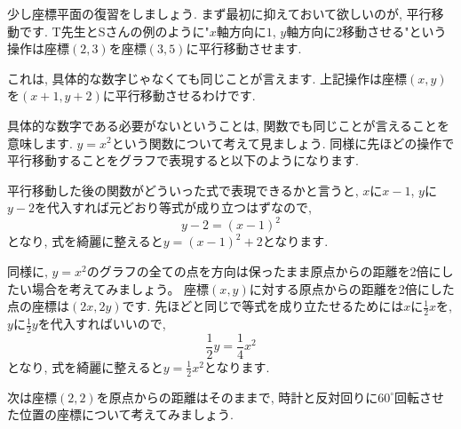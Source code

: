 \documentclass[a4paper,12pt]{jreport}
\theoremstyle{definition}
\newcommand{\ang}[1]{#1^\circ}
\begin{document}
   少し座標平面の復習をしましょう.
   まず最初に抑えておいて欲しいのが, 平行移動です.
   T先生とSさんの例のように"$x$軸方向に$1$, $y$軸方向に$2$移動させる"という操作は座標$(2, 3)$を座標$(3, 5)$に平行移動させます.
   
   これは, 具体的な数字じゃなくても同じことが言えます.
   上記操作は座標$(x, y)$を$(x+1, y+2)$に平行移動させるわけです.
   
   具体的な数字である必要がないということは, 関数でも同じことが言えることを意味します.
   $y=x^2$という関数について考えて見ましょう.
   同様に先ほどの操作で平行移動することをグラフで表現すると以下のようになります.

   \begin{center}
   \end{center}

   平行移動した後の関数がどういった式で表現できるかと言うと,
   $x$に$x-1$, $y$に$y-2$を代入すれば元どおり等式が成り立つはずなので,
   $$y-2=(x-1)^2$$
   となり, 式を綺麗に整えると$y=(x-1)^2+2$となります.

   同様に,
   $y=x^2$のグラフの全ての点を方向は保ったまま原点からの距離を2倍にしたい場合を考えてみましょう。
   座標$(x,y)$に対する原点からの距離を2倍にした点の座標は$(2x,2y)$です.
   先ほどと同じで等式を成り立たせるためには$x$に$\frac{1}{2}x$を,
   $y$に$\frac{1}{2}y$を代入すればいいので,
   $$\frac{1}{2}y=\frac{1}{4}x^2$$
   となり, 式を綺麗に整えると$y=\frac{1}{2}x^2$となります.
   
   次は座標$(2,2)$を原点からの距離はそのままで,
   時計と反対回りに$\ang{60}$回転させた位置の座標について考えてみましょう.
   
   \begin{center}
   \end{center}
\end{document}
